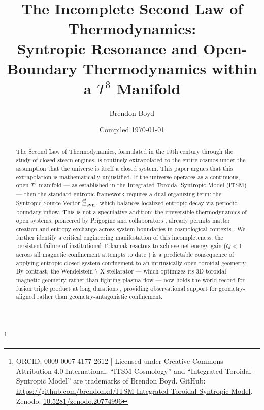 \documentclass[aps,prd,11pt,onecolumn,superscriptaddress,nofootinbib,floatfix]{revtex4-2}
\begin{document}
\title{The Incomplete Second Law of Thermodynamics: \\ Syntropic Resonance and Open-Boundary Thermodynamics within a $T^3$ Manifold}
\author{Brendon Boyd}
\thanks{ORCID: 0009-0007-4177-2612 | Licensed under Creative Commons Attribution 4.0 International. ``ITSM Cosmology'' and ``Integrated Toroidal-Syntropic Model'' are trademarks of Brendon Boyd. GitHub: \url{https://github.com/brendohxd/ITSM-Integrated-Toroidal-Syntropic-Model}. Zenodo: \href{https://doi.org/10.5281/zenodo.20774996}{10.5281/zenodo.20774996}}
\date{Compiled \today}

\begin{abstract}
The Second Law of Thermodynamics, formulated in the 19th century through the study of closed steam engines, is routinely extrapolated to the entire cosmos under the assumption that the universe is itself a closed system. This paper argues that this extrapolation is mathematically unjustified. If the universe operates as a continuous, open $T^3$ manifold --- as established in the Integrated Toroidal-Syntropic Model (ITSM) \cite{itsm_main} --- then the standard entropic framework requires a dual organizing term: the Syntropic Source Vector $\vec{\Xi}_{\rm syn}$, which balances localized entropic decay via periodic boundary inflow. This is not a speculative addition: the irreversible thermodynamics of open systems, pioneered by Prigogine and collaborators \cite{prigogine_1989}, already permits matter creation and entropy exchange across system boundaries in cosmological contexts \cite{open_systems_2023}. We further identify a critical engineering manifestation of this incompleteness: the persistent failure of institutional Tokamak reactors to achieve net energy gain ($Q < 1$ across all magnetic confinement attempts to date \cite{fusion_q_2025}) is a predictable consequence of applying entropic closed-system confinement to an intrinsically open toroidal geometry. By contrast, the Wendelstein 7-X stellarator --- which optimizes its 3D toroidal magnetic geometry rather than fighting plasma flow --- now holds the world record for fusion triple product at long durations \cite{w7x_2025}, providing observational support for geometry-aligned rather than geometry-antagonistic confinement.
\end{abstract}

\maketitle
\end{document}

